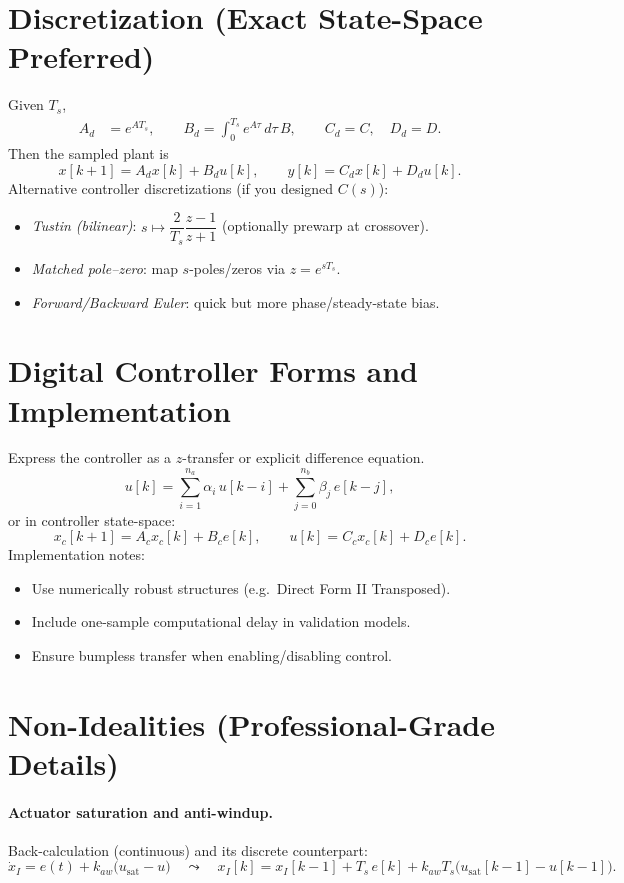 \documentclass[11pt,a4paper]{article}
\begin{document}
	\section{Discretization (Exact State-Space Preferred)}
	Given $T_s$,
	\begin{align*}
		A_d &= e^{A T_s},\qquad
		B_d = \int_0^{T_s} e^{A\tau}\,d\tau\,B,\qquad
		C_d = C,\quad D_d = D.
	\end{align*}
	Then the sampled plant is
	$$
	x[k{+}1] = A_d x[k] + B_d u[k], \qquad y[k] = C_d x[k] + D_d u[k].
	$$
	Alternative controller discretizations (if you designed $C(s)$):
	\begin{itemize}
		\item \emph{Tustin (bilinear)}: $s \mapsto \dfrac{2}{T_s}\dfrac{z-1}{z+1}$ (optionally prewarp at crossover).
		\item \emph{Matched pole--zero}: map $s$-poles/zeros via $z = e^{sT_s}$.
		\item \emph{Forward/Backward Euler}: quick but more phase/steady-state bias.
	\end{itemize}
	
	\section{Digital Controller Forms and Implementation}
	Express the controller as a $z$-transfer or explicit difference equation.
	\[
	u[k] = \sum_{i=1}^{n_a} \alpha_i\,u[k-i] + \sum_{j=0}^{n_b} \beta_j\,e[k-j],
	\]
	or in controller state-space:
	\[
	x_c[k{+}1] = A_c x_c[k] + B_c e[k],\qquad u[k] = C_c x_c[k] + D_c e[k].
	\]
	Implementation notes:
	\begin{itemize}
		\item Use numerically robust structures (e.g.\ Direct Form II Transposed).
		\item Include one-sample computational delay in validation models.
		\item Ensure bumpless transfer when enabling/disabling control.
	\end{itemize}
	
	\section{Non-Idealities (Professional-Grade Details)}
	\paragraph{Actuator saturation and anti-windup.} Back-calculation (continuous) and its discrete counterpart:
	$$
	\dot x_I = e(t) + k_{aw}\big(u_{\text{sat}} - u\big)
	\quad\leadsto\quad
	x_I[k] = x_I[k{-}1] + T_s\,e[k] + k_{aw} T_s \big(u_{\text{sat}}[k{-}1]-u[k{-}1]\big).
	$$
	
\end{document}
